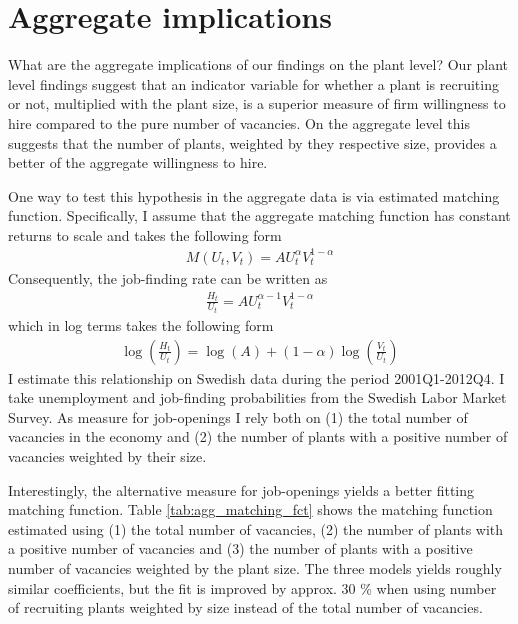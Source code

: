 \section{Aggregate implications}
\label{sec:agg_implications}

What are the aggregate implications of our findings on the plant level? Our plant level findings suggest that an indicator variable for whether a plant is recruiting or not, multiplied with the plant size, is a superior measure of firm willingness to hire compared to the pure number of vacancies. On the aggregate level this suggests that the number of plants, weighted by they respective size, provides a better of the aggregate willingness to hire.

One way to test this hypothesis in the aggregate data is via estimated matching function. Specifically, I assume that the aggregate matching function has constant returns to scale and takes the following form
\begin{align}
M(U_t, V_t)=AU_t^{\alpha}V_t^{1-\alpha}
\end{align}
Consequently, the job-finding rate can be written as
\begin{align}
\frac{H_t}{U_t}=AU_t^{\alpha-1} V_t^{1-\alpha}
\end{align}
which in log terms takes the following form
\begin{align}
\log\left(\frac{H_t}{U_t}\right) =\log(A)+\left(1-\alpha\right)\log\left(\frac{V_t}{U_t}\right) 
\end{align}
I estimate this relationship on Swedish data during the period 2001Q1-2012Q4. I take unemployment and job-finding probabilities from the Swedish Labor Market Survey. As measure for job-openings I rely both on (1) the total number of vacancies in the economy and (2) the number of plants with a positive number of vacancies weighted by their size.

Interestingly, the alternative measure for job-openings yields a better fitting matching function. Table \ref{tab:agg_matching_fct} shows the matching function estimated using (1) the total number of vacancies, (2) the number of plants with a positive number of vacancies and (3) the number of plants with a positive number of vacancies weighted by the plant size. The three models yields roughly similar coefficients, but the fit is improved by approx. 30 \% when using number of recruiting plants weighted by size instead of the total number of vacancies.



